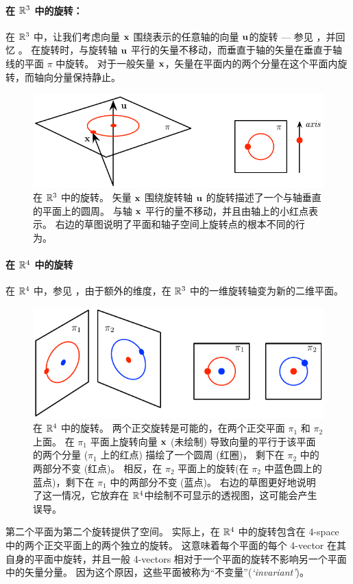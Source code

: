 \paragraph{在 ${\mathbb R}^3$ 中的旋转：} 
%
在 ${\mathbb R}^3$ 中，让我们考虑向量 ${\bf x}$ 围绕表示的任意轴的向量 ${\bf u}$的旋转 --- 参见 ，并回忆 。
在旋转时，与旋转轴 ${\bf u}$ 平行的矢量不移动，而垂直于轴的矢量在垂直于轴线的平面 $\pi$ 中旋转。 
对于一般矢量 ${\bf x}$，矢量在平面内的两个分量在这个平面内旋转，而轴向分量保持静止。
%
\begin{figure}[tb]
\begin{center}
\includegraphics{figures/isoclinic3}
\caption{%
在 ${\mathbb R}^3$ 中的旋转。 
矢量 ${\bf x}$ 围绕旋转轴 ${\bf u}$ 的旋转描述了一个与轴垂直的平面上的圆周。 
与轴 ${\bf x}$ 平行的量不移动，并且由轴上的小红点表示。
右边的草图说明了平面和轴子空间上旋转点的根本不同的行为。 
}
\label{fig:isoclinic3}
\end{center}
\end{figure}


\paragraph{在 ${\mathbb R}^4$ 中的旋转} 
%
在 ${\mathbb R}^4$ 中，参见 ，由于额外的维度，在 ${\mathbb R}^3$ 中的一维旋转轴变为新的二维平面。
%
\begin{figure}[tb]
\begin{center}
\includegraphics{figures/isoclinic4}
\caption{%
在 ${\mathbb R}^4$ 中的旋转。 
两个正交旋转是可能的，在两个正交平面 $\pi_1$ 和 $\pi_2$ 上面。 
在 $\pi_1$ 平面上旋转向量 ${\bf x}$ (未绘制) 导致向量的平行于该平面的两个分量 ($\pi_1$ 上的红点) 描绘了一个圆周 (红圈)，
剩下在 $\pi_2$ 中的两部分不变 (红点)。
相反，在 $\pi_2$ 平面上的旋转(在 $\pi_2$ 中蓝色圆上的蓝点)，剩下在 $\pi_1$ 中的两部分不变 (蓝点)。
右边的草图更好地说明了这一情况，它放弃在 ${\mathbb R}^4$中绘制不可显示的透视图，这可能会产生误导。
}
\label{fig:isoclinic4}
\end{center}
\end{figure}
%
第二个平面为第二个旋转提供了空间。
实际上，在 ${\mathbb R}^4$ 中的旋转包含在 4-space 中的两个正交平面上的两个独立的旋转。 
这意味着每个平面的每个 4-vector 在其自身的平面中旋转，并且一般 4-vectors 相对于一个平面的旋转不影响另一个平面中的矢量分量。 
因为这个原因，这些平面被称为“不变量”(\emph{`invariant'})。

